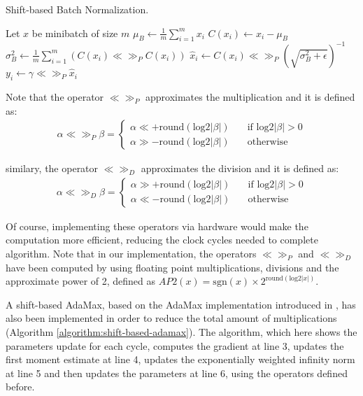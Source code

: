\documentclass[a4paper]{article}
\numberwithin{equation}{section} %
\numberwithin{figure}{section} %
\numberwithin{table}{section} %
\theoremstyle{definition}
\begin{document}
\begin{algorithm}
	\caption{Shift-based Batch Normalization\cite{binarynet}.}
	\label{algorithm:shift-based-batch-norm}
	\begin{algorithmic}[1]
	\State Let $x$ be minibatch of size $m$
	\State $\mu_B \gets \frac{1}{m} \sum_{i=1}^m x_i$
	\State $C(x_i) \gets x_i - \mu_B$
	\State $\sigma_B^2 \gets \frac{1}{m} \sum_{i=1}^m
	    (C(x_i)\ll\gg_P C(x_i))$
	\State $\hat{x}_i \gets C(x_i)\ll\gg_P (\sqrt{\sigma_B^2
	    + \epsilon})^{-1} $
	\State $y_i \gets \gamma\ll\gg_P\hat{x}_i$
	\end{algorithmic}
\end{algorithm}

Note that the
operator $\ll\gg_P$ approximates the multiplication and it is
defined as:
\begin{align*}
    \alpha \ll\gg_P \beta
        = \begin{cases}
    	    \alpha \ll +\text{round}(\text{log2}|\beta|) & \quad \text{if } \text{log2}|\beta| > 0\\
    		\alpha \gg -\text{round}(\text{log2}|\beta|) & \quad \text{otherwise} 
    	    \end{cases}
\end{align*}

\noindent similary, the operator $\ll\gg_D$ approximates the 
division and it is defined as:
\begin{align*}
    \alpha \ll\gg_D \beta
        = \begin{cases}
    	    \alpha \gg +\text{round}(\text{log2}|\beta|) & \quad \text{if } \text{log2}|\beta| > 0\\
    		\alpha \ll -\text{round}(\text{log2}|\beta|) & \quad \text{otherwise} 
    	    \end{cases}
\end{align*}

Of course, implementing these operators via hardware would 
make the computation more efficient, reducing the clock
cycles needed to complete algorithm. Note that
in our implementation, the operators $\ll\gg_P$ and
$\ll\gg_D$ have been computed by using floating point
multiplications, divisions and the approximate power of 2,
defined as
$AP2(x) = \text{sgn}(x)\times2^{\text{round}(\text{log2}
|x|)}$.

A shift-based AdaMax, based on the AdaMax implementation
introduced in \cite{adam}, has also been implemented in
order to reduce the total amount of multiplications
(Algorithm \ref{algorithm:shift-based-adamax}).
The algorithm, which
here shows the parameters update for each cycle, computes
the gradient at line 3, updates the first moment estimate
at line 4, updates the exponentially weighted infinity norm
at line 5 and then updates the parameters at line 6,
using the operators defined before.
\end{document}
